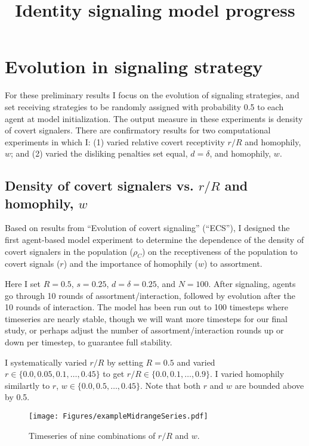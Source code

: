 \documentclass[11pt,letterpaper]{article}
\title{\vspace{-1in}Identity signaling model progress}
\author{} %
\begin{document}
\maketitle

\section*{Evolution in signaling strategy}

For these preliminary results I focus on the evolution of signaling strategies,
and set receiving strategies to be randomly assigned with probability 0.5 to
each agent at model initialization. The output measure in these experiments
is density of covert signalers. There are confirmatory results for two
computational experiments in which I: (1) varied relative covert receptivity $r/R$ and 
homophily, $w$; and (2) varied the disliking penalties set equal, $d=\delta$,
and homophily, $w$.

\subsection*{Density of covert signalers vs. $r/R$ and homophily, $w$}

Based on results from ``Evolution of covert signaling'' (``ECS''), I designed
the first agent-based model experiment to determine the dependence of the
density of covert signalers in the population ($\rho_C$) on
the receptiveness of the population to covert signals ($r$) and the
importance of homophily ($w$) to assortment. 

Here I set $R=0.5$, $s=0.25$, $d=\delta=0.25$,
and $N=100$. After signaling, agents go through 10 rounds of assortment/interaction,
followed by evolution after the 10 rounds of interaction. The model has been
run out to 100 timesteps where timeseries are nearly stable, though we will
want more timesteps for our final study, or perhaps adjust the number of 
assortment/interaction rounds up or down per timestep, to guarantee full 
stability.

I systematically varied $r/R$ by setting $R=0.5$ and varied 
$r \in \{0.0, 0.05, 0.1, \ldots, 0.45\}$ to get $r/R \in \{0.0, 0.1, \ldots, 0.9\}$.
I varied homophily similartly to $r$, $w \in \{0.0, 0.5, \ldots, 0.45\}$. Note
that both $r$ and $w$ are bounded above by 0.5.

\begin{figure}[H]
  \centering
  \texttt{[image: Figures/exampleMidrangeSeries.pdf]}
  \caption{Timeseries of nine combinations of $r/R$ and $w$.}
  \label{fig:receptivityHomophilySeries}
\end{figure}
\end{document}
